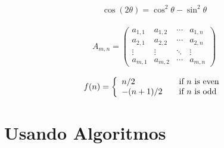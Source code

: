 \lipsum[4]

	\begin{equation}
		\begin{aligned}
			\cos (2\theta) = \cos^2 \theta - \sin^2 \theta
		\end{aligned}
	\end{equation}
	
\lipsum[5]

	\begin{equation}
		\begin{aligned}
			A_{m,n} =
			\begin{pmatrix}
			a_{1,1} & a_{1,2} & \cdots & a_{1,n} \\
			a_{2,1} & a_{2,2} & \cdots & a_{2,n} \\
			\vdots  & \vdots  & \ddots & \vdots  \\
			a_{m,1} & a_{m,2} & \cdots & a_{m,n}
			\end{pmatrix}
		\end{aligned}
	\end{equation}

\lipsum[6]

	\begin{equation}
		\begin{aligned}
			f(n) = \left\{ 
			\begin{array}{l l}
			n/2 & \quad \text{if $n$ is even}\\
			-(n+1)/2 & \quad \text{if $n$ is odd}
			\end{array} \right.
		\end{aligned}
	\end{equation}
	
\lipsum[7]

\section{Usando Algoritmos}

\lipsum[8]

\begin{algorithm}[h!]
	\SetSpacedAlgorithm
	\caption{\label{alg:algoritmo_de_colonica_de_formigas}Algoritmo de Otimização por Colônia de Formiga}
\end{algorithm}

